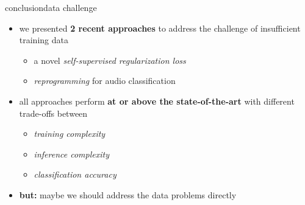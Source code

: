 \begin{frame}{conclusion}{data challenge}
    \vspace{-2mm}
			\begin{itemize}
        \item   we presented \textbf{2 recent approaches} to address the challenge of insufficient training data
            \begin{itemize}
                \item   a novel \textit{self-supervised regularization loss}
                \item   \textit{reprogramming} for audio classification
            \end{itemize}
            \bigskip
        \item   all approaches perform \textbf{at or above the state-of-the-art} with different trade-offs between
            \begin{itemize}
                \item   \textit{training complexity}
                \item   \textit{inference complexity}
                \item   \textit{classification accuracy}
            \end{itemize}
						\bigskip
				\item \textbf{but:} maybe we should address the data problems directly
    \end{itemize}
\end{frame}


